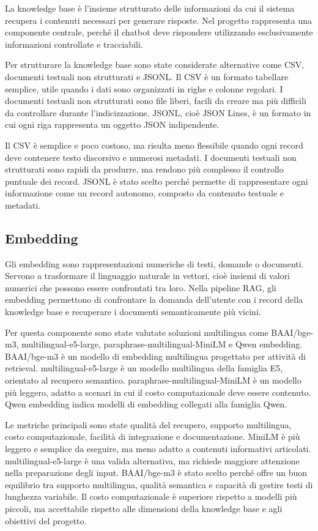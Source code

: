 La knowledge base è l’insieme strutturato delle informazioni da cui il sistema recupera i contenuti necessari per generare risposte. Nel progetto rappresenta una componente centrale, perché il chatbot deve rispondere utilizzando esclusivamente informazioni controllate e tracciabili.

Per strutturare la knowledge base sono state considerate alternative come CSV, documenti testuali non strutturati e JSONL. Il CSV è un formato tabellare semplice, utile quando i dati sono organizzati in righe e colonne regolari. I documenti testuali non strutturati sono file liberi, facili da creare ma più difficili da controllare durante l’indicizzazione. JSONL, cioè JSON Lines, è un formato in cui ogni riga rappresenta un oggetto JSON indipendente.

Il CSV è semplice e poco costoso, ma risulta meno flessibile quando ogni record deve contenere testo discorsivo e numerosi metadati. I documenti testuali non strutturati sono rapidi da produrre, ma rendono più complesso il controllo puntuale dei record. JSONL è stato scelto perché permette di rappresentare ogni informazione come un record autonomo, composto da contenuto testuale e metadati.

\subsection*{Embedding}

Gli embedding sono rappresentazioni numeriche di testi, domande o documenti. Servono a trasformare il linguaggio naturale in vettori, cioè insiemi di valori numerici che possono essere confrontati tra loro. Nella pipeline RAG, gli embedding permettono di confrontare la domanda dell’utente con i record della knowledge base e recuperare i documenti semanticamente più vicini.

Per questa componente sono state valutate soluzioni multilingua come BAAI/bge-m3, multilingual-e5-large, paraphrase-multilingual-MiniLM e Qwen embedding. BAAI/bge-m3 è un modello di embedding multilingua progettato per attività di retrieval. multilingual-e5-large è un modello multilingua della famiglia E5, orientato al recupero semantico. paraphrase-multilingual-MiniLM è un modello più leggero, adatto a scenari in cui il costo computazionale deve essere contenuto. Qwen embedding indica modelli di embedding collegati alla famiglia Qwen.

Le metriche principali sono state qualità del recupero, supporto multilingua, costo computazionale, facilità di integrazione e documentazione. MiniLM è più leggero e semplice da eseguire, ma meno adatto a contenuti informativi articolati. multilingual-e5-large è una valida alternativa, ma richiede maggiore attenzione nella preparazione degli input. BAAI/bge-m3 è stato scelto perché offre un buon equilibrio tra supporto multilingua, qualità semantica e capacità di gestire testi di lunghezza variabile. Il costo computazionale è superiore rispetto a modelli più piccoli, ma accettabile rispetto alle dimensioni della knowledge base e agli obiettivi del progetto.

